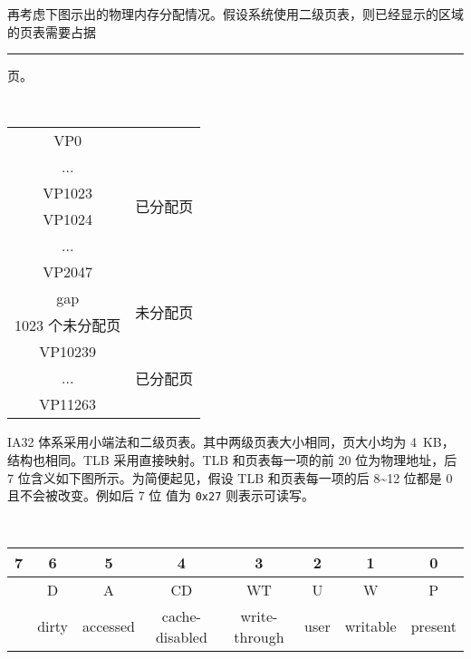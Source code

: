 \begin{problems}
        再考虑下图示出的物理内存分配情况。假设系统使用二级页表，则已经显示的区域的页表需要占据 \rule{2.5cm}{0.25mm} 页。
        \begin{table}[H]
            \tt
            \centering
            \begin{tabular}{|c|c|}
                \hline
                {\quad VP0 \quad} & \multirow{6}{*}{\quad 已分配页 \quad} \\ \cline{1-1}
                ... &  \\ \cline{1-1}
                VP1023 &  \\ \cline{1-1}
                VP1024 &  \\ \cline{1-1}
                ... &  \\ \cline{1-1}
                VP2047 &  \\ \hline
                \multirow{2}{*}{gap} & \multirow{4}{*}{未分配页} \\
                &  \\ \cline{1-1}
                \multirow{2}{*}{1023 个未分配页} &  \\
                &  \\ \hline
                VP10239 & \multirow{4}{*}{已分配页} \\ \cline{1-1}
                ... &  \\ \cline{1-1}
                VP11263 &  \\ \hline
                \end{tabular}
        \end{table}
        \qn IA32 体系采用小端法和二级页表。其中两级页表大小相同，页大小均为 \SI{4}{KB}，结构也相同。TLB 采用直接映射。TLB 和页表每一项的前 20 位为物理地址，后 7 位含义如下图所示。为简便起见，假设 TLB 和页表每一项的后 8\textasciitilde 12 位都是 0 且不会被改变。例如后 7 位 值为 \verb|0x27| 则表示可读写。
        \begin{table}[H]
            \tt
            \centering
            \begin{tabular}{cccccccc}
                {\footnotesize 7} & {\footnotesize 6} & {\footnotesize 5} & {\footnotesize 4} & {\footnotesize 3} & {\footnotesize 2} & {\footnotesize 1} & {\footnotesize 0} \\ \hline
                \multicolumn{1}{|c|}{\cellcolor{gray!50}} & \multicolumn{1}{c|}{D} & \multicolumn{1}{c|}{A} & \multicolumn{1}{c|}{CD} & \multicolumn{1}{c|}{WT} & \multicolumn{1}{c|}{U} & \multicolumn{1}{c|}{W} & \multicolumn{1}{c|}{P} \\ \hline
                & {\footnotesize dirty} & {\footnotesize accessed} & {\footnotesize cache-disabled} & {\footnotesize write-through} & {\footnotesize user} & {\footnotesize writable} & {\footnotesize present}

\end{tabular}
\end{table}
\end{problems}
